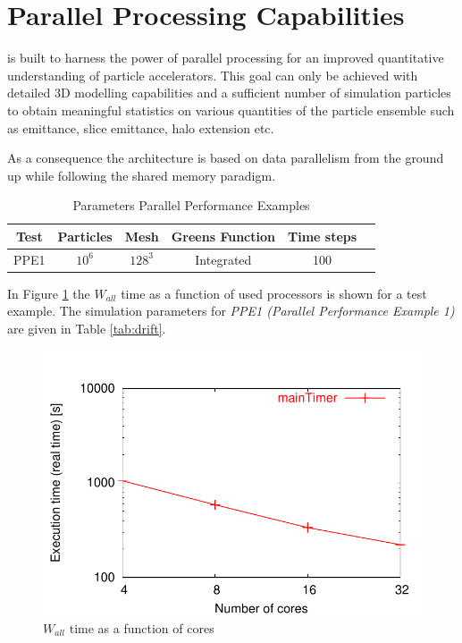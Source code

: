 \section{Parallel Processing Capabilities}
\opal is built to harness the power of parallel processing for an improved quantitative understanding
of particle accelerators.
This goal can only be achieved with
detailed 3D modelling capabilities and a sufficient number of simulation particles to obtain meaningful statistics on various 
quantities of the particle ensemble such as emittance, slice emittance, halo extension etc. 

As a consequence the \opal architecture is based on data parallelism from the ground up while following the shared memory paradigm. 

\begin{table}[ht]
\caption{Parameters Parallel Performance Examples }
   \label{tab:drift}
\centering %
\begin{tabular}{c c c c c c} %
\hline\hline %
Test & Particles  & Mesh & Greens Function & Time steps  \\ [0.75ex] %
\hline %
PPE1 & $10^6$ & $128^3$ & Integrated  & 100 \\ [1ex] %
\hline %
\end{tabular}
\label{table:nonlin} %
\end{table}

In Figure \ref{fig:walldrift} the $W_{all}$ time as a function of used processors is shown for a test example. The simulation parameters for {\em PPE1 (Parallel Performance Example 1)}  are given in 
Table \ref{tab:drift}.
\begin{figure}[ht]
 \begin{center}
 \includegraphics[width=0.5\linewidth,angle=0]{figures/speedup/Drift/mainTimer}
  \caption{$W_{all}$ time as a function of cores}
  \label{fig:walldrift}
 \end{center}
\end{figure}

